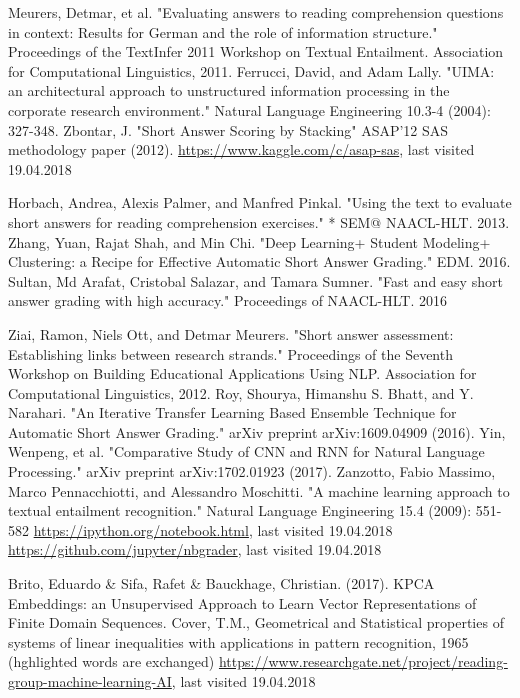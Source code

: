 \documentclass[rnd]{mas_report}
\begin{document}
\begin{thebibliography}{3}
 Meurers, Detmar, et al. "Evaluating answers to reading comprehension questions in context: Results for German and the role of information structure." Proceedings of the TextInfer 2011 Workshop on Textual Entailment. Association for Computational Linguistics, 2011.
 Ferrucci, David, and Adam Lally. "UIMA: an architectural approach to unstructured information processing in the corporate research environment." Natural Language Engineering 10.3-4 (2004): 327-348.
 Zbontar, J. "Short Answer Scoring by Stacking" ASAP'12 SAS methodology paper (2012).
 \url{https://www.kaggle.com/c/asap-sas}, last visited 19.04.2018



 Horbach, Andrea, Alexis Palmer, and Manfred Pinkal. "Using the text to evaluate short answers for reading comprehension exercises." * SEM@ NAACL-HLT. 2013.
 Zhang, Yuan, Rajat Shah, and Min Chi. "Deep Learning+ Student Modeling+ Clustering: a Recipe for Effective Automatic Short Answer Grading." EDM. 2016.
 Sultan, Md Arafat, Cristobal Salazar, and Tamara Sumner. "Fast and easy short answer grading with high accuracy." Proceedings of NAACL-HLT. 2016

 Ziai, Ramon, Niels Ott, and Detmar Meurers. "Short answer assessment: Establishing links between research strands." Proceedings of the Seventh Workshop on Building Educational Applications Using NLP. Association for Computational Linguistics, 2012.
 Roy, Shourya, Himanshu S. Bhatt, and Y. Narahari. "An Iterative Transfer Learning Based Ensemble Technique for Automatic Short Answer Grading." arXiv preprint arXiv:1609.04909 (2016).
 Yin, Wenpeng, et al. "Comparative Study of CNN and RNN for Natural Language Processing." arXiv preprint arXiv:1702.01923 (2017).
 Zanzotto, Fabio Massimo, Marco Pennacchiotti, and Alessandro Moschitti. "A machine learning approach to textual entailment recognition." Natural Language Engineering 15.4 (2009): 551-582
 \url{https://ipython.org/notebook.html}, last visited 19.04.2018
 \url{https://github.com/jupyter/nbgrader}, last visited 19.04.2018


 Brito, Eduardo \& Sifa, Rafet \& Bauckhage, Christian. (2017). KPCA Embeddings: an Unsupervised Approach to Learn Vector Representations of Finite Domain Sequences.
 Cover, T.M., Geometrical and Statistical properties of systems of linear inequalities with applications in pattern recognition, 1965 (hghlighted words are exchanged)
 \url{https://www.researchgate.net/project/reading-group-machine-learning-AI}, last visited 19.04.2018


\end{thebibliography}
\end{document}
